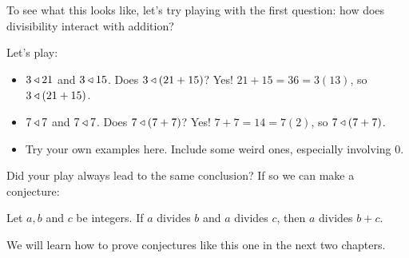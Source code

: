 To see what this looks like, let's try playing with the first question:  how does divisibility interact with addition?

Let's play:

\begin{itemize}
	\item $3 \triangleleft 21$ and $3 \triangleleft 15$.  Does $3 \triangleleft (21+15)$? Yes!  $21+15 = 36 = 3(13)$, so $3 \triangleleft (21+15)$.
	\item $7 \triangleleft 7$ and $7 \triangleleft 7$.  Does $7 \triangleleft (7+7)$?   Yes!  $7+7  =14 = 7(2)$, so $7 \triangleleft (7+7)$.
	\item Try your own examples here.  Include some weird ones, especially involving $0$.
\end{itemize}


Did your play always lead to the same conclusion?  If so we can make a conjecture:

\begin{conjecture}
	Let $a,b$ and $c$ be integers.  If $a$ divides $b$ and $a$ divides $c$, then $a$ divides $b+c$.
\end{conjecture}

We will learn how to prove conjectures like this one in the next two chapters.

